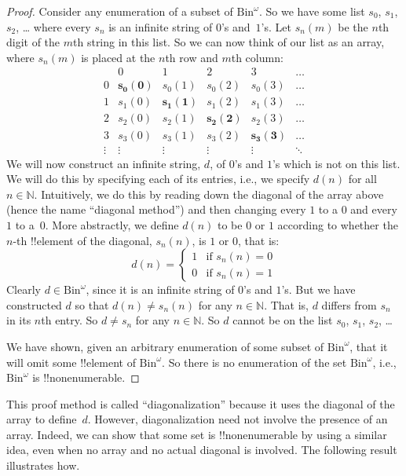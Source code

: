 \documentclass[10pt,a4paper]{article}
\theoremstyle{plain}
\theoremstyle{definition}
\theoremstyle{remark}
\newenvironment{explain}{}{}
\providecommand{\Nat}{\ensuremath{\mathbb{N}}}
\providecommand{\Bin}{\mathrm{Bin}}
\begin{document}
\begin{proof}
Consider any enumeration of a subset of $\Bin^\omega$. So we have some
list $s_{0}$, $s_{1}$, $s_{2}$, \dots{} where every $s_n$ is an
infinite string of $0$'s and~$1$'s. Let $s_n(m)$ be the $n$th digit of
the $m$th string in this list. So we can now think of our list as an
array, where $s_n(m)$ is placed at the $n$th row and $m$th column:
\[
\begin{array}{c|c|c|c|c|c}
& 0 & 1 & 2 & 3 & \dots \\\hline
0 & \mathbf{s_{0}(0)} & s_{0}(1) & s_{0}(2) & s_0(3) & \dots \\\hline
1 & s_{1}(0)& \mathbf{s_{1}(1)} & s_1(2) & s_1(3) & \dots \\\hline
2 & s_{2}(0)& s_{2}(1) & \mathbf{s_2(2)} & s_2(3) & \dots \\\hline
3 & s_{3}(0)& s_{3}(1) & s_3(2) & \mathbf{s_3(3)} & \dots \\\hline
\vdots & \vdots & \vdots & \vdots & \vdots & \mathbf{\ddots}
\end{array}
\]
We will now construct an infinite string, $d$, of $0$'s and $1$'s
which is not on this list.  We will do this by specifying each of its
entries, i.e., we specify $d(n)$ for all $n \in \Nat$.  Intuitively,
we do this by reading down the diagonal of the array above (hence the
name ``diagonal method'') and then changing every $1$ to a $0$ and
every $1$ to a~$0$. More abstractly, we define $d(n)$ to be $0$ or $1$
according to whether the $n$-th !!{element} of the diagonal, $s_n(n)$,
is $1$ or $0$, that is:
\[
d(n) =
\begin{cases}
1 & \text{if $s_{n}(n) = 0$}\\
0 & \text{if $s_{n}(n) = 1$}
\end{cases}
\]
Clearly $d \in \Bin^\omega$, since it is an infinite string of $0$'s
and $1$'s. But we have constructed $d$ so that $d(n) \neq s_n(n)$ for
any $n \in \Nat$. That is, $d$ differs from $s_n$ in its $n$th entry.
So $d \neq s_n$ for any $n\in \Nat$. So $d$ cannot be on the list
$s_0$, $s_1$, $s_2$,
\dots

We have shown, given an arbitrary enumeration of some subset of
$\Bin^\omega$, that it will omit some !!{element} of $\Bin^\omega$. So
there is no enumeration of the set $\Bin^\omega$, i.e., $\Bin^\omega$
is !!{nonenumerable}.
\end{proof}

\begin{explain}
This proof method is called ``diagonalization'' because it uses the
diagonal of the array to define~$d$. However, diagonalization need
not involve the presence of an array. Indeed, we can show that some set is 
!!{nonenumerable} by using a similar idea, even when no array and no
actual diagonal is involved. The following result illustrates how.
\end{explain}
\end{document}

